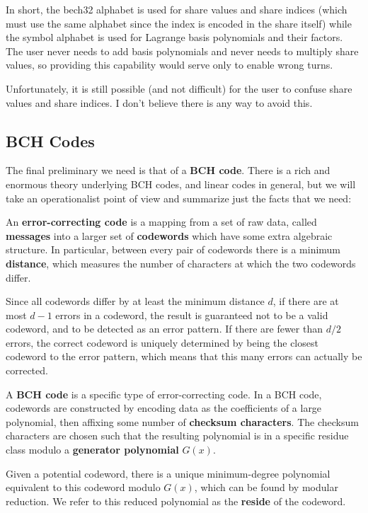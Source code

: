 \documentclass[letterpaper]{article}
\theoremstyle{xxx}
\theoremstyle{evil}
\theoremstyle{yyy}
\theoremstyle{plain}
\theoremstyle{zzz}
\begin{document}
In short, the bech32 alphabet is used for share values and share indices (which must
use the same alphabet since the index is encoded in the share itself) while the
symbol alphabet is used for Lagrange basis polynomials and their factors. The user
never needs to add basis polynomials and never needs to multiply share values, so
providing this capability would serve only to enable wrong turns.

Unfortunately, it is still possible (and not difficult) for the user to confuse
share values and share indices. I don't believe there is any way to avoid this.

\subsection{BCH Codes}

The final preliminary we need is that of a \textbf{BCH code}. There is a
rich and enormous theory underlying BCH codes, and linear codes in general,
but we will take an operationalist point of view and summarize just the facts
that we need:

An \textbf{error-correcting code} is a mapping from a set of raw data, called
\textbf{messages} into a larger set of \textbf{codewords} which have
some extra algebraic structure. In particular, between every pair of
codewords there is a minimum \textbf{distance}, which measures the
number of characters at which the two codewords differ.

Since all codewords differ by at least the minimum distance $d$, if there
are at most $d-1$ errors in a codeword, the result is guaranteed not to
be a valid codeword, and to be detected as an error pattern. If there are fewer
than $d/2$ errors, the correct codeword is uniquely determined by being
the closest codeword to the error pattern, which means that this many
errors can actually be corrected.

A \textbf{BCH code} is a specific type of error-correcting code. In a BCH
code, codewords are constructed by encoding data as the coefficients of a
large polynomial, then affixing some number of \textbf{checksum characters}.
The checksum characters are chosen such that the resulting polynomial is in
a specific residue class modulo a \textbf{generator polynomial} $G(x)$.

Given a potential codeword, there is a unique minimum-degree polynomial
equivalent to this codeword modulo $G(x)$, which can be found by modular
reduction. We refer to this reduced polynomial as the \textbf{reside}
of the codeword.
\end{document}
